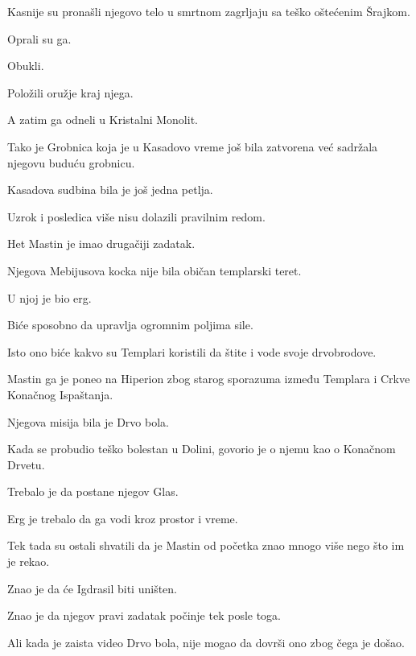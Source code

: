 \bigskip

Kasnije su pronašli njegovo telo u smrtnom zagrljaju sa teško oštećenim Šrajkom.

Oprali su ga.

Obukli.

Položili oružje kraj njega.

\bigskip

A zatim ga odneli u Kristalni Monolit.

\bigskip

Tako je Grobnica koja je u Kasadovo vreme još bila zatvorena već sadržala njegovu buduću grobnicu.

\bigskip

Kasadova sudbina bila je još jedna petlja.

Uzrok i posledica više nisu dolazili pravilnim redom.

\bigskip

Het Mastin je imao drugačiji zadatak.

\bigskip

Njegova Mebijusova kocka nije bila običan templarski teret.

U njoj je bio erg.

Biće sposobno da upravlja ogromnim poljima sile.

Isto ono biće kakvo su Templari koristili da štite i vode svoje drvobrodove.

\bigskip

Mastin ga je poneo na Hiperion zbog starog sporazuma između Templara i Crkve Konačnog Ispaštanja.

\bigskip

Njegova misija bila je Drvo bola.

\bigskip

Kada se probudio teško bolestan u Dolini, govorio je o njemu kao o Konačnom Drvetu.

Trebalo je da postane njegov Glas.

Erg je trebalo da ga vodi kroz prostor i vreme.

\bigskip

Tek tada su ostali shvatili da je Mastin od početka znao mnogo više nego što im je rekao.

Znao je da će Igdrasil biti uništen.

Znao je da njegov pravi zadatak počinje tek posle toga.

\bigskip

Ali kada je zaista video Drvo bola, nije mogao da dovrši ono zbog čega je došao.

